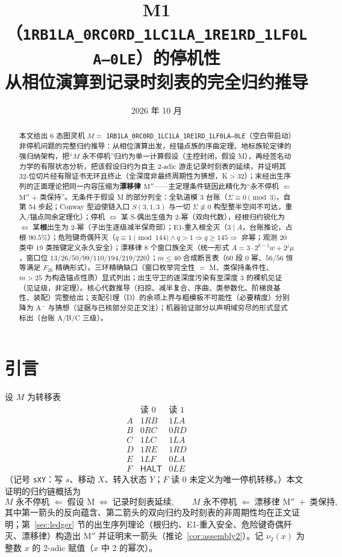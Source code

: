 \documentclass[11pt]{ctexart}
\title{\bfseries M1（\texttt{1RB1LA\_0RC0RD\_1LC1LA\_1RE1RD\_1LF0LA---0LE}）的停机性\\ \large 从相位演算到记录时刻表的完全归约推导}
\author{}
\date{2026 年 10 月}
\theoremstyle{definition}
\newcommand{\vtwo}[1]{\nu_2(#1)}
\newcommand{\HALT}{\textsf{HALT}}
\begin{document}
\maketitle

\begin{abstract}
本文给出 6 态图灵机 $M=$ \texttt{1RB1LA\_0RC0RD\_1LC1LA\_1RE1RD\_1LF0LA---0LE}（空白带启动）非停机问题的完整归约推导：从相位演算出发，经锚点族的序曲定理、地标族轮定律的强归纳架构，把``$M$ 永不停机''归约为单一计算假设（主控封闭，假设 M），再经签名动力学的有限状态分析，把该假设归约为自主 2-adic 游走记录时刻表的延续，并证明其 32-位切片经有限证书无环且终止（全深度非最终周期性为猜想，K$>$32）；末经出生序列的正面理论把同一内容压缩为\textbf{漂移律 $\mathrm{M''}$}——主定理条件链因此精化为``永不停机 $\Leftarrow$ $\mathrm{M''}$ $+$ 类保持''。无条件于假设 M 的部分列全：全轨道模 3 台账（$\Sigma\equiv0\pmod3$，自第 54 步起；Conway 型迫使链入口 $S(3,1,3)$ 与一切 $\Sigma\not\equiv0$ 构型整半空间不可达，重入/锚点同余定理化）；停机 $\iff$ 某 S-偶出生值为 2-幂（双向代数），经根归约锐化为 $\iff$ 某\textbf{根}出生为 2-幂（子出生逐级减半保奇部）；E1-重入根全灭（$3\mid A$，台账推论，占根 $90.5\%$）；危险键奇偶歼灭（$q\equiv1\pmod{144}\wedge q>1\Rightarrow q\ge145\Rightarrow$ 非幂；观测 20 类中 19 类按键定义永久安全）；漂移律 8 个窗口族全灭（统一形式 $A=3\cdot2^{k-1}w+2^{j}\mu$，窗口位 $13/26/50/99/110/194/219/220$）；$m\le40$ 合成断言表（60 段 0 幂、$56/56$ 恒等满足 $F_{26}$ 精确形式）。三环精确缺口（窗口枚举完全性 $=$ M、类保持条件性、$m>25$ 为构造锚点性质）显式列出；出生守卫的逐深度污染有至深度 3 的裸机见证（见证级，非定理）。核心代数推导（扫掠、减半复合、序曲、类参数化、阶梯良基性、装配）完整给出；支配引理（D）的余项上界与粗模板不可能性（必要精度）分别降为 A$^-$ 与猜想（证据与已核部分见正文注）；机器验证部分以声明域穷尽的形式显式标出（台账 A/B/C 三级）。
\end{abstract}

\section{引言}

设 $M$ 为转移表
\[
\begin{array}{c|cc}
 & \text{读 }0 & \text{读 }1\\\hline
A & 1RB & 1LA\\
B & 0RC & 0RD\\
C & 1LC & 1LA\\
D & 1RE & 1RD\\
E & 1LF & 0LA\\
F & \HALT & 0LE
\end{array}
\]
（记号 \texttt{sXY}：写 $s$、移动 $X$、转入状态 $Y$；$F$ 读 $0$ 未定义为唯一停机转移。）本文证明的归约链概括为
\[
\text{$M$ 永不停机}\;\Longleftarrow\;\text{假设 M}\;\Longleftrightarrow\;\text{记录时刻表延续},
\qquad
\text{$M$ 永不停机}\;\Longleftarrow\;\text{漂移律 $\mathrm{M''}$}\;+\;\text{类保持},
\]
其中第一箭头的反向蕴含、第二箭头的双向归约及时刻表的非周期性均在正文证明；第~\ref{sec:ledger} 节的出生序列理论（根归约、E1-重入安全、危险键奇偶歼灭、漂移律）构造出 $\mathrm{M''}$ 并证明末一箭头（推论~\ref{cor:assembly2}）。记 $\vtwo{x}$ 为整数 $x$ 的 2-adic 赋值（$x$ 中 2 的幂次）。
\end{document}
